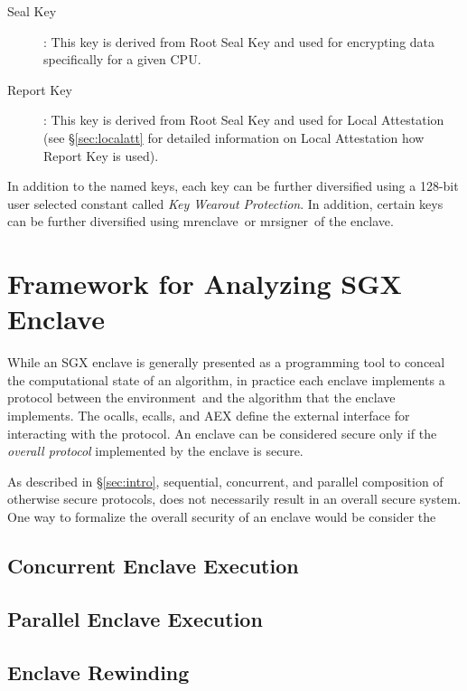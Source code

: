 \documentclass[10pt]{article}
\newcommand{\secref}[1]{\S\ref{#1}}
\newcommand{\ecall}{\textsf{ecall}}
\newcommand{\ocall}{\textsf{ocall}}
\newcommand{\env}{\textsf{environment}}
\newcommand{\mrenclave}{\textsf{mrenclave}}
\newcommand{\mrsigner}{\textsf{mrsigner}}
\begin{document}
\begin{description}
      \item[Seal Key]: This key is derived from Root Seal Key and used
      for encrypting data specifically for a given CPU.

      \item[Report Key]: This key is derived from Root Seal Key and used
      for Local Attestation (see \secref{sec:localatt} for detailed
      information on Local Attestation how Report Key is used).

  \end{description}

  In addition to the named keys, each key can be further diversified using
  a 128-bit user selected constant called \textit{Key Wearout Protection}. 
  In addition, certain keys can be further diversified using \mrenclave\ 
  or \mrsigner\ of the enclave.

  \section{Framework for Analyzing SGX Enclave}
  \label{sec:analysisfwk}

  While an SGX enclave is generally presented as a programming tool
  to conceal the computational state of an algorithm, in practice each
  enclave implements a protocol between the \env\ and the algorithm that
  the enclave implements. The \ocall s, \ecall s, and AEX define the 
  external interface for interacting with the protocol. An enclave can be
  considered secure only if the \textit{overall protocol} implemented 
  by the enclave is secure.

  As described in \secref{sec:intro}, sequential, concurrent, and parallel
  composition of otherwise secure protocols, does not necessarily result
  in an overall secure system. One way to formalize the overall security
  of an enclave would be consider the 

  \subsection{Concurrent Enclave Execution}
  \label{ssec:concexec}

  \subsection{Parallel Enclave Execution}
  \label{ssec:parallelexec}

  \subsection{Enclave Rewinding}
  \label{ssec:rewinding}
\end{document}
